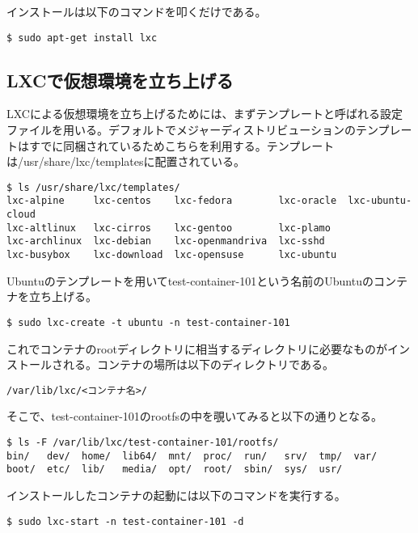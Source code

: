 \documentclass[9pt,b5paper,tombo]{jsbook}
\begin{document}
インストールは以下のコマンドを叩くだけである。

\begin{lstlisting}
$ sudo apt-get install lxc
\end{lstlisting}

\subsection{LXCで仮想環境を立ち上げる}
LXCによる仮想環境を立ち上げるためには、まずテンプレートと呼ばれる設定ファイルを用いる。デフォルトでメジャーディストリビューションのテンプレートはすでに同梱されているためこちらを利用する。テンプレートは/usr/share/lxc/templatesに配置されている。

\begin{lstlisting}
$ ls /usr/share/lxc/templates/
lxc-alpine     lxc-centos    lxc-fedora        lxc-oracle  lxc-ubuntu-cloud
lxc-altlinux   lxc-cirros    lxc-gentoo        lxc-plamo
lxc-archlinux  lxc-debian    lxc-openmandriva  lxc-sshd
lxc-busybox    lxc-download  lxc-opensuse      lxc-ubuntu
\end{lstlisting}

Ubuntuのテンプレートを用いてtest-container-101という名前のUbuntuのコンテナを立ち上げる。

\begin{lstlisting}
$ sudo lxc-create -t ubuntu -n test-container-101
\end{lstlisting}

これでコンテナのrootディレクトリに相当するディレクトリに必要なものがインストールされる。コンテナの場所は以下のディレクトリである。

\begin{lstlisting}
/var/lib/lxc/<コンテナ名>/
\end{lstlisting}

そこで、test-container-101のrootfsの中を覗いてみると以下の通りとなる。

\begin{lstlisting}
$ ls -F /var/lib/lxc/test-container-101/rootfs/
bin/   dev/  home/  lib64/  mnt/  proc/  run/   srv/  tmp/  var/
boot/  etc/  lib/   media/  opt/  root/  sbin/  sys/  usr/
\end{lstlisting}

インストールしたコンテナの起動には以下のコマンドを実行する。

\begin{lstlisting}
$ sudo lxc-start -n test-container-101 -d
\end{lstlisting}
\end{document}
